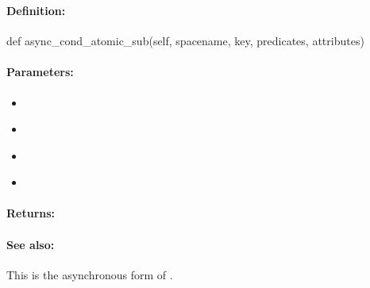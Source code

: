 \pagebreak
\subsubsection{}
\label{api:python:async_cond_atomic_sub}


\paragraph{Definition:}
\begin{pythoncode}
def async_cond_atomic_sub(self, spacename, key, predicates, attributes)
\end{pythoncode}

\paragraph{Parameters:}
\begin{itemize}[noitemsep]
\item {}\\

\item {}\\

\item {}\\

\item {}\\

\end{itemize}

\paragraph{Returns:}


\paragraph{See also:}  This is the asynchronous form of .

\pagebreak
\subsubsection{}
\label{api:python:group_atomic_sub}


